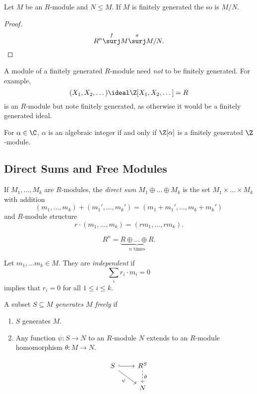 \documentclass[a4paper]{article}
\begin{document}
\begin{corollary}
  Let \(M\) be an \(R\)-module and \(N \leq M\). If \(M\) is finitely generated the so is \(M/N\).
\end{corollary}

\begin{proof}
  \[
    R^n \overset{f}{\surj} M \overset{\pi}{\surj} M/N.
  \]
\end{proof}

\begin{note}
  A module of a finitely generated \(R\)-module need \emph{not} to be finitely generated. For example,
  \[
    (X_1, X_2, \dots) \ideal \Z[X_1, X_2, \dots] = R
  \]
  is an \(R\)-module but note finitely generated, as otherwise it would be a finitely generated ideal.
\end{note}

\begin{eg}
  For \(\alpha \in \C\), \(\alpha\) is an algebraic integer if and only if \(\Z[\alpha]\) is a finitely generated \(\Z\)-module.
\end{eg}

\subsection{Direct Sums and Free Modules}

\begin{definition}
  If \(M_1, \dots, M_k\) are \(R\)-modules, the \emph{direct sum} \(M_1 \oplus \dots \oplus M_k\) is the set \(M_1 \times \dots \times M_k\) with addition
  \[
    (m_1, \dots, m_k) + (m_1', \dots, m_k') = (m_1 + m_1', \dots, m_k + m_k')
  \]
  and \(R\)-module structure
  \[
    r \cdot (m_1, \dots, m_k) = (rm_1, \dots, rm_k).
  \]
\end{definition}

\begin{eg}
  \[
    R^n = \underbrace{R \oplus \dots \oplus R}_{n \text{ times}}.
  \]
\end{eg}

\begin{definition}[Independence]
  Let \(m_1, \dots m_k \in M\). They are \emph{independent} if
  \[
    \sum_i r_i \cdot m_i = 0
  \]
  implies that \(r_i = 0\) for all \(1 \leq i \leq k\).
\end{definition}

\begin{definition}
  A subset \(S \subseteq M\) \emph{generates \(M\) freely} if
    \begin{enumerate}
    \item \(S\) generates \(M\).
    \item Any function \(\psi: S \to N\) to an \(R\)-module \(N\) extends to an \(R\)-module homomorphism \(\theta: M \to N\).
    \end{enumerate}
    \[
      \begin{tikzcd}
        S \ar[r, hook] \ar[dr, "\psi"'] & R^S \ar[d, dashed, "\theta"] \\
        & N
      \end{tikzcd}
    \]
\end{definition}
\end{document}
